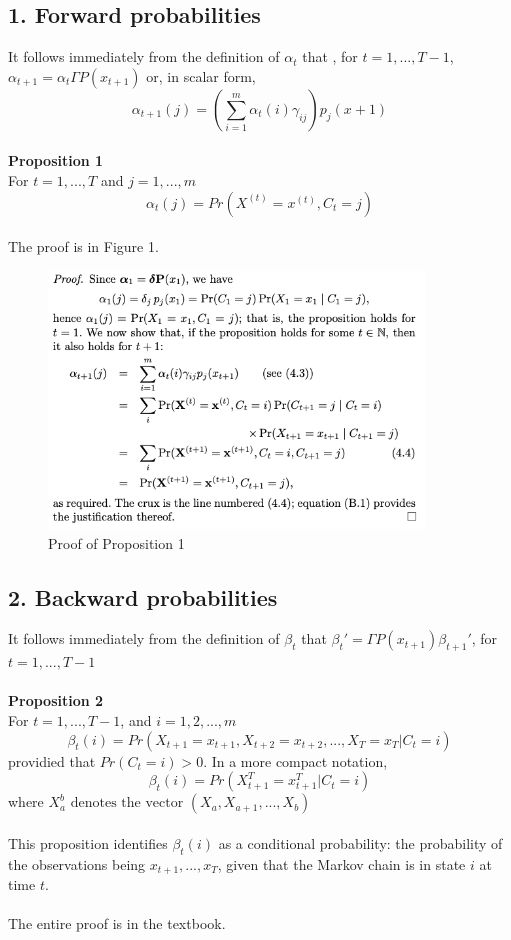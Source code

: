 \documentclass{article}
\begin{document}
\subsection*{1. Forward probabilities}
It follows immediately from the definition of $\alpha_t$ that , for $t = 1, ..., T-1$, $\alpha_{t+1} = \alpha_t \Gamma P(x_{t+1})$ or, in scalar form, 
$$\alpha_{t+1}(j) = (\sum_{i=1}^m \alpha_t(i)\gamma_{ij}) p_j(x+1)$$
\\
\textbf{Proposition 1} \\
For $t = 1, ..., T$ and $j = 1, ..., m$
$$\alpha_t(j) = Pr(X^{(t)} = x^{(t)}, C_t = j)$$
\\
The proof is in Figure 1.
\begin{figure}
    \includegraphics[width = 10cm]{prop 2.png}
    \caption{Proof of Proposition 1}
\end{figure}

\subsection*{2. Backward probabilities}
It follows immediately from the definition of $\beta_t$ that $\beta_t' = \Gamma P(x_{t+1}) \beta_{t+1}'$, for $t = 1, ..., T-1$ \\
\\
\textbf{Proposition 2} \\
For $t = 1, ..., T - 1$, and $i = 1, 2, ..., m$
$$\beta_t(i) = Pr(X_{t+1} = x_{t+1}, X_{t+2} = x_{t+2}, ..., X_T = x_T | C_t = i)$$
providied that $Pr(C_t = i) > 0$. In a more compact notation,
$$\beta_t(i) = Pr(X_{t+1}^T = x_{t+1}^T | C_t = i)$$
where $X_a^b \text{ denotes the vector } (X_a, X_{a+1}, ..., X_b)$
\\
\\
This proposition identifies $\beta_t(i)$ as a conditional probability: the probability of the observations being $x_{t+1}, ..., x_T$, given that the Markov chain is in state $i$ at time $t$. \\
\\
The entire proof is in the textbook.
\end{document}
